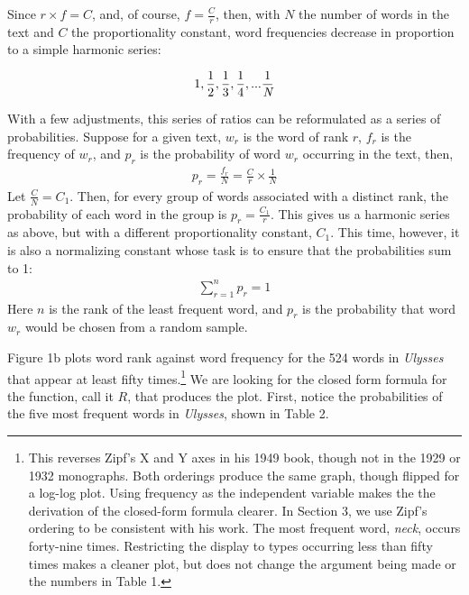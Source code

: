 \documentclass[12pt]{article}
\begin{document}
Since $r\times f = C$, and, of course, $f = \frac{C}{r}$, then, with $N$ the number of words in the text and $C$ the proportionality constant, word frequencies decrease in proportion to a simple harmonic series:


\begin{align}
1,\frac{1}{2},\frac{1}{3},\frac{1}{4},...\frac{1}{\emph{N}}
\end{align}
\noindent

With a few adjustments, this series of ratios can be reformulated as a series of probabilities. Suppose for a given text, $w_r$ is the word of rank $r$, $f_r$ is the frequency of $w_r$, and $p_r$ is the probability of word $w_r$ occurring in the text, then,
\begin{align}
p_r=\frac{f_r}{N}=\frac{C}{r}\times\frac{1}{N}
\end{align}
\noindent
Let $\frac{C}{N} = C_1$.  Then, for every group of words associated with a distinct rank, the probability of each word in the group is $p_r = \frac{C_1}{r}$.  This gives us a harmonic series as above, but with a different proportionality constant, $C_1$. This time, however, it is also a normalizing constant whose task is to ensure that the probabilities sum to 1:
\begin{align}
\sum_{r=1}^{n} p_r = 1
\end{align}
\noindent
Here $n$ is the rank of the least frequent word, and $p_r$ is the probability that word $w_r$ would be chosen from a random sample.  

Figure 1b plots word rank against word frequency for the 524 words in \emph{Ulysses} that appear at least fifty times.\footnote[5]{This reverses Zipf's X and Y axes in his 1949 book, though not in the 1929 or 1932 monographs.  Both orderings produce the same graph, though flipped for a log-log plot. Using frequency as the independent variable makes the the derivation of the closed-form formula clearer.  In Section 3, we use Zipf's ordering to be consistent with his work. The  most frequent word, \emph{neck}, occurs forty-nine times. Restricting the display to types occurring less than fifty times makes a cleaner plot, but does not change the argument being made or the numbers in Table 1.}  We are looking for the closed form formula for the function, call it $R$, that produces the plot.  First, notice the probabilities of the five most frequent words in \emph{Ulysses}, shown in Table 2.  
\end{document}
